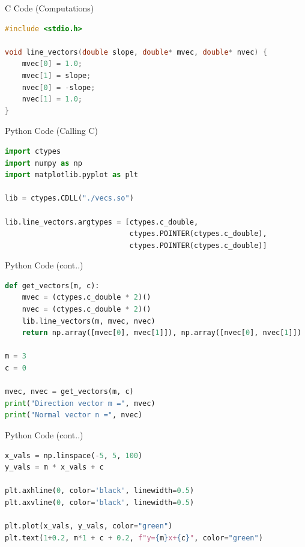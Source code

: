 \documentclass{beamer}
\begin{document}

\begin{frame}[fragile]{C Code (Computations)}
\begin{lstlisting}[language=C]
#include <stdio.h>

void line_vectors(double slope, double* mvec, double* nvec) {
    mvec[0] = 1.0;
    mvec[1] = slope;
    nvec[0] = -slope;
    nvec[1] = 1.0;
}
\end{lstlisting}
\end{frame}


\begin{frame}[fragile]{Python Code (Calling C)}
\begin{lstlisting}[language=Python]
import ctypes
import numpy as np
import matplotlib.pyplot as plt

lib = ctypes.CDLL("./vecs.so")

lib.line_vectors.argtypes = [ctypes.c_double,
                             ctypes.POINTER(ctypes.c_double),
                             ctypes.POINTER(ctypes.c_double)]
\end{lstlisting}
\end{frame}

\begin{frame}[fragile]{Python Code (cont..)}
\begin{lstlisting}[language=Python]
def get_vectors(m, c):
    mvec = (ctypes.c_double * 2)()
    nvec = (ctypes.c_double * 2)()
    lib.line_vectors(m, mvec, nvec)
    return np.array([mvec[0], mvec[1]]), np.array([nvec[0], nvec[1]])

m = 3
c = 0

mvec, nvec = get_vectors(m, c)
print("Direction vector m =", mvec)
print("Normal vector n =", nvec)
\end{lstlisting}
\end{frame}

\begin{frame}[fragile]{Python Code (cont..)}
\begin{lstlisting}[language=Python]
x_vals = np.linspace(-5, 5, 100)
y_vals = m * x_vals + c

plt.axhline(0, color='black', linewidth=0.5)
plt.axvline(0, color='black', linewidth=0.5)

plt.plot(x_vals, y_vals, color="green")
plt.text(1+0.2, m*1 + c + 0.2, f"y={m}x+{c}", color="green")
\end{lstlisting}
\end{frame}
\end{document}
